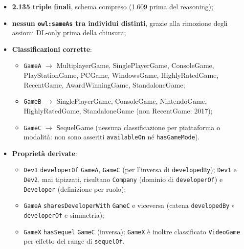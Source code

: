 \begin{itemize}[nosep]
  \item \textbf{2.135 triple finali}, schema compreso (1.609 prima del reasoning);
  \item \textbf{nessun \texttt{owl:sameAs} tra individui distinti}, grazie alla rimozione degli assiomi
    DL-only prima della chiusura;
  \item \textbf{Classificazioni corrette}:
    \begin{itemize}[nosep]
      \item \texttt{GameA} $\rightarrow$ MultiplayerGame, SinglePlayerGame,
        ConsoleGame, PlayStationGame, PCGame, WindowsGame, HighlyRatedGame, RecentGame,
        AwardWinningGame, StandaloneGame;
      \item \texttt{GameB} $\rightarrow$ SinglePlayerGame, ConsoleGame,
        NintendoGame, HighlyRatedGame, StandaloneGame (non RecentGame: 2017);
      \item \texttt{GameC} $\rightarrow$ SequelGame (nessuna classificazione per
        piattaforma o modalit\`a: non sono asseriti \texttt{availableOn} n\'e
        \texttt{hasGameMode}).
    \end{itemize}
  \item \textbf{Propriet\`a derivate}:
    \begin{itemize}[nosep]
      \item \texttt{Dev1} \texttt{developerOf} \texttt{GameA}, \texttt{GameC}
        (per l'inversa di \texttt{developedBy}); \texttt{Dev1} e \texttt{Dev2}, mai tipizzati, risultano
        \texttt{Company} (dominio di \texttt{developerOf}) e \texttt{Developer} (definizione per ruolo);
      \item \texttt{GameA} \texttt{sharesDeveloperWith} \texttt{GameC} e viceversa
        (catena \texttt{developedBy} $\circ$ \texttt{developerOf} e simmetria);
      \item \texttt{GameX} \texttt{hasSequel} \texttt{GameC} (inversa); \texttt{GameX}
        \`e inoltre classificato \texttt{VideoGame} per effetto del range di
        \texttt{sequelOf}.
    \end{itemize}
\end{itemize}
